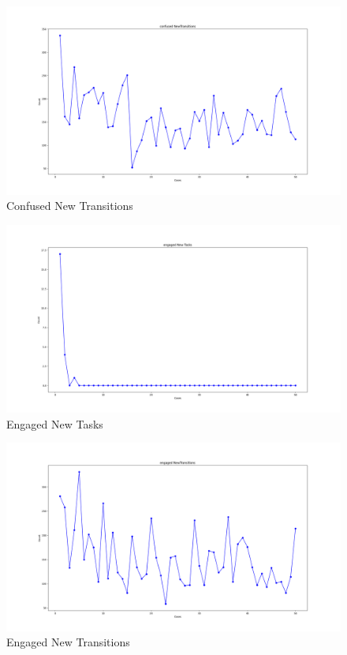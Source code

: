 \begin{figure}
    \centering   
    \includegraphics[width=1\linewidth]{images/confused NewTransitions.png}
    \caption{Confused New Transitions}
    \label{fig:image22}
\end{figure}\clearpage
\begin{figure}
    \centering   
    \includegraphics[width=1\linewidth]{images/engaged New Tasks.png}
    \caption{Engaged New Tasks}
    \label{fig:image23}
\end{figure}
\begin{figure}
    \centering   
    \includegraphics[width=1\linewidth]{images/engaged NewTransitions.png}
    \caption{Engaged New Transitions}
    \label{fig:image24}
\end{figure}\clearpage
